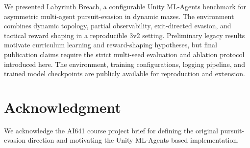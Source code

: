 \documentclass[conference]{IEEEtran}
\begin{document}
We presented Labyrinth Breach, a configurable Unity ML-Agents benchmark for asymmetric multi-agent pursuit-evasion in dynamic mazes. The environment combines dynamic topology, partial observability, exit-directed evasion, and tactical reward shaping in a reproducible 3v2 setting. Preliminary legacy results motivate curriculum learning and reward-shaping hypotheses, but final publication claims require the strict multi-seed evaluation and ablation protocol introduced here. The environment, training configurations, logging pipeline, and trained model checkpoints are publicly available for reproduction and extension.

\section*{Acknowledgment}

We acknowledge the AI641 course project brief for defining the original pursuit-evasion direction and motivating the Unity ML-Agents based implementation.
\end{document}
